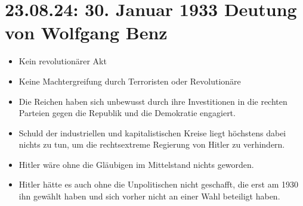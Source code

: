 \documentclass[12pt,a4paper]{report}
\begin{document}
	\section{23.08.24: 30. Januar 1933 Deutung von Wolfgang Benz}
	\begin{itemize}
		\item Kein revolutionärer Akt
		\item Keine Machtergreifung durch Terroristen oder Revolutionäre
		\item Die Reichen haben sich unbewusst durch ihre Investitionen in die rechten Parteien gegen die Republik und die Demokratie engagiert.
		\item Schuld der industriellen und kapitalistischen Kreise liegt höchstens dabei nichts zu tun, um die rechtsextreme Regierung von Hitler zu verhindern.
		\item Hitler wäre ohne die Gläubigen im Mittelstand nichts geworden.
		\item Hitler hätte es auch ohne die Unpolitischen nicht geschafft, die erst am 1930 ihn gewählt haben und sich vorher nicht an einer Wahl beteiligt haben.
	\end{itemize}
\end{document}
